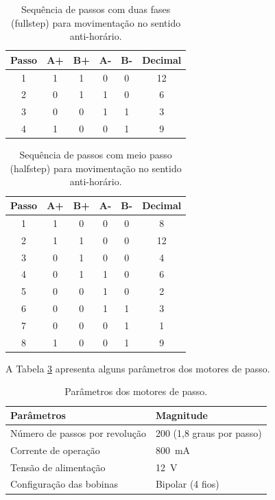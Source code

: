 \begin{table}[H]
    \footnotesize
    \centering
    \caption{Sequência de passos com duas fases (fullstep) para movimentação no sentido anti-horário.}
    \begin{tabular}{cccccc}
        \hline
        \textbf{Passo} & \textbf{A+} & \textbf{B+} & \textbf{A-} & \textbf{B-} & \textbf{Decimal}\\
        \hline
        1 & 1 & 1 & 0 & 0 & 12\\
        2 & 0 & 1 & 1 & 0 & 6\\
        3 & 0 & 0 & 1 & 1 & 3\\
        4 & 1 & 0 & 0 & 1 & 9\\
        \hline       
    \end{tabular}
    \label{tab:fullstepantihorario}
\end{table}

\begin{table}[H]
    \footnotesize
    \centering
    \caption{Sequência de passos com meio passo (halfstep) para movimentação no sentido anti-horário.}
    \begin{tabular}{cccccc}
        \hline
        \textbf{Passo} & \textbf{A+} & \textbf{B+} & \textbf{A-} & \textbf{B-} & \textbf{Decimal}\\
        \hline
        1 & 1 & 0 & 0 & 0 & 8\\
        2 & 1 & 1 & 0 & 0 & 12\\
        3 & 0 & 1 & 0 & 0 & 4\\
        4 & 0 & 1 & 1 & 0 & 6\\
        5 & 0 & 0 & 1 & 0 & 2\\
        6 & 0 & 0 & 1 & 1 & 3\\
        7 & 0 & 0 & 0 & 1 & 1\\
        8 & 1 & 0 & 0 & 1 & 9\\
        \hline       
    \end{tabular}
    \label{tab:halfstepantihorario}
\end{table}

A Tabela \ref{tab:pmotordepasso} apresenta alguns parâmetros dos motores de passo.

\begin{table}[H]
    \footnotesize
    \centering
    \caption{Parâmetros dos motores de passo.}
    \begin{tabular}{ll}
        \hline
        \textbf{Parâmetros} & \textbf{Magnitude}\\
        \hline
        Número de passos por revolução & 200 (1,8 graus por passo)\\
        Corrente de operação & 800~mA\\
        Tensão de alimentação & 12~V\\
        Configuração das bobinas & Bipolar (4 fios)\\
        \hline       
    \end{tabular}
    \label{tab:pmotordepasso}
\end{table}

